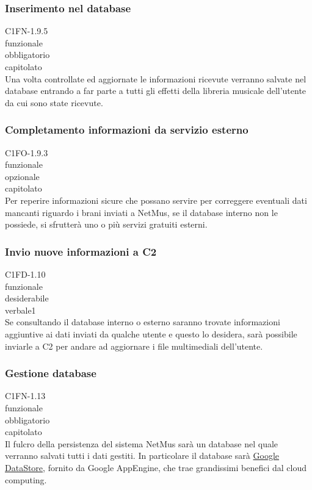 \subsubsection*{Inserimento nel database}
 C1FN-1.9.5 \\
 funzionale \\
 obbligatorio \\
 capitolato \\
Una volta controllate ed aggiornate le informazioni ricevute verranno salvate
nel database entrando a far parte a tutti gli effetti della libreria musicale
dell'utente da cui sono state ricevute.

\subsubsection*{Completamento informazioni da servizio esterno}
 C1FO-1.9.3 \\
 funzionale \\
 opzionale \\
 capitolato \\
Per reperire informazioni sicure che possano servire per correggere eventuali
dati mancanti riguardo i brani inviati a NetMus, se il database interno non le
possiede, si sfrutter\`a uno o pi\`u servizi gratuiti esterni.

\subsubsection*{Invio nuove informazioni a C2}
 C1FD-1.10 \\
 funzionale \\
 desiderabile \\
 verbale1 \\
Se consultando il database interno o esterno saranno trovate informazioni
aggiuntive ai dati inviati da qualche utente e questo lo desidera, sar\`a
possibile inviarle a C2 per andare ad aggiornare i file multimediali
dell'utente.

\subsubsection*{Gestione database}
 C1FN-1.13 \\
 funzionale \\
 obbligatorio \\
 capitolato \\
Il fulcro della persistenza del sistema NetMus sar\`a un database nel quale
verranno salvati tutti i dati gestiti. In particolare il database sar\`a
\underline{Google DataStore}, fornito da Google AppEngine, che trae grandissimi
benefici dal cloud computing.

